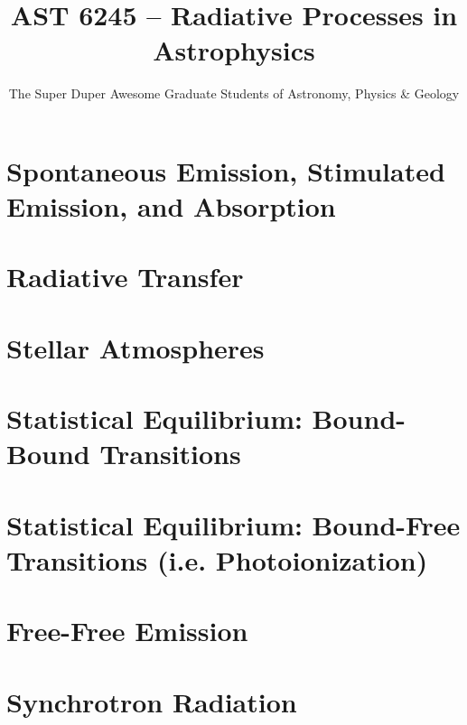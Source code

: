 \documentclass[11pt,letterpaper,notitlepage]{classnotes}
\author{The Super Duper Awesome Graduate Students of Astronomy, Physics \& Geology}
\title{AST 6245 -- Radiative Processes in  Astrophysics}
\begin{document}
\maketitle
\thispagestyle{empty}

\begin{center}
\end{center}
\vskip1cm

\noindent 


\newpage

\tableofcontents

\pagebreak
\chapter{Spontaneous Emission, Stimulated Emission, and Absorption}

\pagebreak

\chapter{Radiative Transfer}

\pagebreak
\chapter{Stellar Atmospheres}



\pagebreak
\chapter{Statistical Equilibrium: Bound-Bound Transitions}

\pagebreak
\chapter{Statistical Equilibrium: Bound-Free Transitions (i.e. Photoionization)}

\pagebreak
\chapter{Free-Free Emission}

\pagebreak
\chapter{Synchrotron Radiation}

\end{document}
